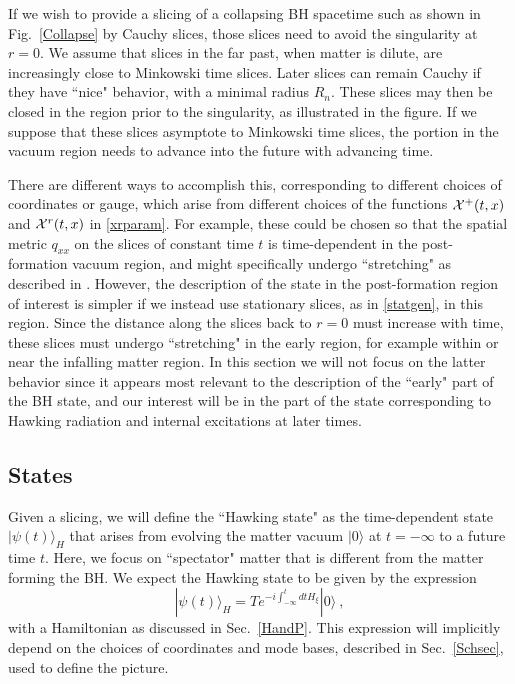\documentclass[12pt]{article}
\numberwithin{equation}{section}
\newcommand{\beq}{\begin{equation}}
\newcommand{\eeq}{\end{equation}}
\begin{document}
If we wish to provide a slicing of a collapsing BH spacetime such as shown in Fig.~\ref{Collapse} by Cauchy slices, those slices need to avoid the singularity at $r=0$.  
We assume that slices in the far past, when matter is dilute, are increasingly close to Minkowski time slices.  Later slices can remain Cauchy
 if they have ``nice" behavior, with a minimal radius $R_n$. These slices may then be closed in the region prior to the singularity, as illustrated in the figure.  If we suppose that these slices asymptote to Minkowski time slices, the portion in the vacuum region needs to advance  into the future with advancing time.  




There are different ways to accomplish this, corresponding to different choices of coordinates or gauge, which arise from different choices of the functions ${\cal X}^+(t,x)$ and ${\cal X}^r(t,x)$ in \eqref{xrparam}.  For example, these could be chosen so that the spatial metric $q_{xx}$ on the slices of constant time $t$ is time-dependent in the post-formation vacuum region, and might specifically undergo ``stretching" as described in \cite{Mathinforev}.  However, the description of the state in the post-formation region of interest is simpler if we instead use stationary slices, as in \eqref{statgen}, in this region.  Since the distance along the slices back to $r=0$ must increase with time, these slices must undergo ``stretching" in the early region, for example within or near the infalling matter region.  In this section we will not focus on the latter behavior since it appears most relevant to the description of the ``early" part of the BH state, and our interest will be in the part of the state corresponding to Hawking radiation and internal excitations at later times.

\subsection{States}

Given a slicing, we will define the ``Hawking state" as the time-dependent state $|\psi(t)\rangle_H$ that arises from evolving the matter vacuum $|0\rangle$ at $t=-\infty$ to a future time $t$.  Here, we focus on ``spectator" matter that is different from the matter forming the BH.  We expect the Hawking state to be given by the expression
\beq\label{Hevol}
|\psi(t)\rangle_H = T e^{ -i \int_{-\infty}^tdt H_\xi}|0\rangle\ ,
\eeq
with a Hamiltonian as discussed in Sec.~\ref{HandP}.  This expression will implicitly depend on the choices of coordinates and mode bases, described in Sec.~\ref{Schsec}, used to define the picture.
\end{document}
